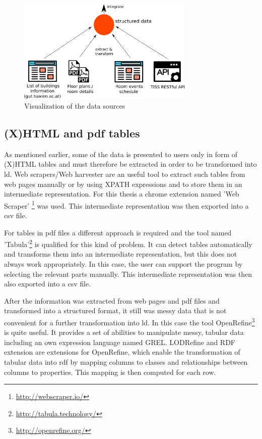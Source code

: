 \documentclass[draft,final]{vutinfth} %
\begin{document}
\begin{figure}[h]
    \centering
    \includegraphics[width=0.75\textwidth]{graphics/dataAcquisitionSources.png}
    \caption{Visualization of the data sources}
    \label{fig:solution-data-acquisition:sources}
\end{figure}


\subsection{(X)HTML and \gls{pdf} tables}
\label{solution-data-acquisition-tables}
As mentioned earlier, some of the data is presented to users only in form of (X)HTML tables and must therefore be extracted in order to be transformed into \gls{ld}. Web scrapers/Web harvester are an useful tool to extract such tables from web pages manually or by using XPATH expressions and to store them in an intermediate representation. For this thesis a chrome extension named 'Web Scraper' \footnote{\url{http://webscraper.io/}} was used. This intermediate representation was then exported into a \gls{csv} file. 

For tables in \gls{pdf} files a different approach is required and the tool named 'Tabula'\footnote{\url{http://tabula.technology/}} is qualified for this kind of problem. It can detect tables automatically and transforms them into an intermediate representation, but this does not always work appropriately. In this case, the user can support the program by selecting the relevant parts manually. This intermediate representation was then also exported into a \gls{csv} file.

After the information was extracted from web pages and \gls{pdf} files and transformed into a structured format, it still was messy data that is not convenient for a further transformation into \gls{ld}. In this case the tool OpenRefine\footnote{\url{http://openrefine.org/}} is quite useful. It provides a set of abilities to manipulate messy, tabular data including an own expression language named GREL. LODRefine and RDF extension are extensions for OpenRefine, which enable the transformation of tabular data into \gls{rdf} by mapping columns to classes and relationships between columns to properties. This mapping is then computed for each row. 
\end{document}
